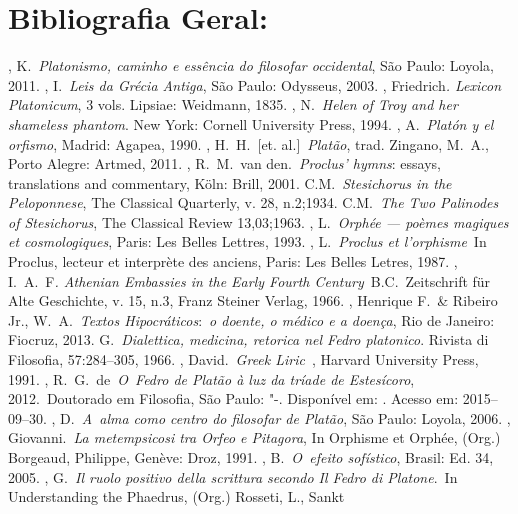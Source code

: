  

 

\section{Bibliografia Geral:}


\begin{bibliohedra}
, K.~\emph{Platonismo, caminho e essência do filosofar
  occidental}, São Paulo: Loyola, 2011.
, I.~\emph{Leis da Grécia Antiga}, São Paulo: Odysseus,
  2003.
, Friedrich\emph{. Lexicon Platonicum}, 3 vols. Lipsiae: Weidmann,
  1835.
, N.~\emph{Helen of Troy and her shameless phantom}. New York:
  Cornell University Press, 1994.
, A.~\emph{Platón y el orfismo}, Madrid: Agapea, 1990.
, H.~H.~[et. al.]~\emph{Platão}, trad. Zingano, M.~A., Porto
  Alegre: Artmed, 2011.
, R.~M.~van den.~\emph{Proclus' hymns}: essays, translations and
  commentary, Köln: Brill, 2001.
 C.M.~\emph{Stesichorus in the Peloponnese}, The Classical
  Quarterly, v. 28, n.2;1934.
 C.M.~\emph{The Two Palinodes of Stesichorus}, The Classical
  Review 13,03;1963.
, L.~\emph{Orphée --- poèmes magiques et cosmologiques}, Paris:
  Les Belles Lettres, 1993.
, L.~\emph{Proclus et l'orphisme}~In Proclus, lecteur et
  interprète des anciens, Paris: Les Belles Letres, 1987.
, I.~A.~F\emph{. Athenian Embassies in the Early Fourth
  Century}~B.C.~Zeitschrift für Alte Geschichte, v. 15, n.3, Franz
  Steiner Verlag, 1966.
, Henrique F.~\& Ribeiro Jr., W.~A.~\emph{Textos
  Hipocráticos}:~\emph{o doente, o médico e a doença}, Rio de Janeiro:
  Fiocruz, 2013.
 G.~\emph{Dialettica, medicina, retorica nel Fedro platonico}.
  Rivista di Filosofia, 57:284--305, 1966.
, David.~\emph{Greek Liric}~, Harvard University Press,
  1991.
, R.~G.~de~\emph{O~Fedro de Platão à luz da tríade de
  Estesícoro}, 2012.~Doutorado em Filosofia, São Paulo: "-.
  Disponível em: . Acesso em: 2015--09--30.
, D.~\emph{A~alma como centro do filosofar de Platão}, São
  Paulo: Loyola, 2006.
, Giovanni.~\emph{La metempsicosi tra Orfeo e Pitagora}, In
  Orphisme et Orphée, (Org.) Borgeaud, Philippe, Genève: Droz, 1991.
, B.~\emph{O~efeito sofístico}, Brasil: Ed. 34, 2005.
, G.~\emph{Il ruolo positivo della scrittura secondo Il Fedro di
  Platone}.~In Understanding the Phaedrus, (Org.) Rosseti, L., Sankt

\end{bibliohedra}
